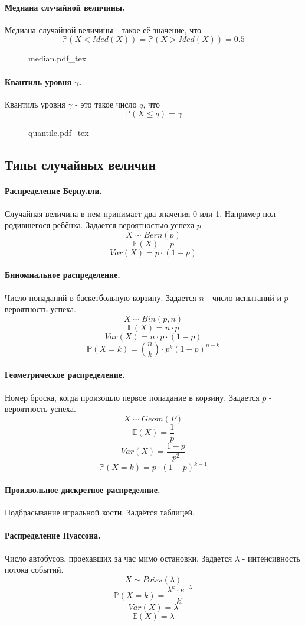 \documentclass{article}
\newcommand{\E}{\mathbb{E}}
\newcommand{\PP}{\mathbb{P}}
\newcommand{\incfig}[2][1]{%
    \def\svgwidth{#1\columnwidth}
    {#2.pdf_tex}
}
\begin{document}
\paragraph{Медиана случайной величины.}
Медиана случайной величины - такое её значение, что
\[
\PP(X<Med(X))=\PP(X>Med(X)) = 0.5
\]
\begin{figure}[h!]
  \centering
  \incfig{median}
\end{figure}
\newpage
\paragraph{Квантиль уровня $\gamma$.}
Квантиль уровня $\gamma$ - это такое число $q$, что
\[
\PP(X\leq q)= \gamma
\]
\begin{figure}[h!]
  \centering
  \incfig{quantile}
\end{figure}
\subsection{Типы случайных величин}
\paragraph{Распределение Бернулли.} Случайная величина в нем принимает два значения 0 или 1. Например пол родившегося ребёнка.
Задается вероятностью успеха $p$
\[
X \sim Bern(p)
\]
\[
\E(X) = p
\]
\[
Var(X)=p \cdot (1-p)
\]
\paragraph{Биномиальное распределение.}
Число попаданий в баскетбольную корзину. Задается $n$ - число испытаний и $p$ - вероятность успеха.
\[
X \sim Bin(p,n)
\]
\[
\E(X) = n \cdot p 
\]
\[
Var(X)= n \cdot p \cdot (1-p)
\]
\[
\PP(X=k)={n \choose k} \cdot p^k(1-p)^{n-k}
\]
\paragraph{Геометрическое распределение.}
Номер броска, когда произошло первое попадание в корзину. Задается $p$ - вероятность успеха.
\[
X \sim Geom(P)
\]
\[
\E(X)=\frac{1}{p}
\]
\[
Var(X)=\frac{1-p}{p^2}
\]
\[
\PP(X=k)=p \cdot (1-p)^{k-1}
\]
\paragraph{Произвольное дискретное распределние.}
Подбрасывание игральной кости. Задаётся таблицей.
\paragraph{Распределение Пуассона.}
Число автобусов, проехавших за час мимо остановки. Задается $\lambda$ - интенсивность потока событий.
\[
X \sim Poiss(\lambda)
\]
\[
\PP(X=k)=\frac{\lambda^k \cdot e^{-\lambda}}{k!}
\]
\[
Var(X)=\lambda
\]
\[
\E(X)=\lambda
\]
\end{document}
